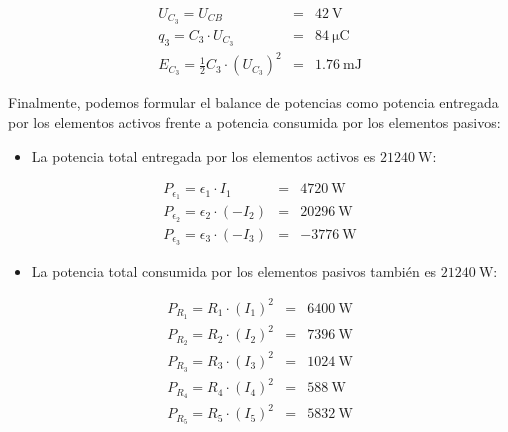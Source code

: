 \vspace{-4mm}
\begin{eqnarray*}
    U_{C_3} = U_{CB} & = & \qty{42}{\volt}\\
    q_3 = C_3 \cdot U_{C_3} & = & \boxed{\qty{84}{\micro\coulomb}}\\
    E_{C_3} = \frac{1}{2} C_3 \cdot (U_{C_3})^2 & = & \boxed{\qty{1.76}{\milli\joule}}
\end{eqnarray*}

\vspace{5mm}
Finalmente, podemos formular el balance de potencias como potencia entregada por los elementos activos frente a potencia consumida por los elementos pasivos:

\vspace{1mm}
\begin{itemize}
    \item La potencia total entregada por los elementos activos es $\qty{21240}{\watt}$:
\end{itemize}

\vspace{-7mm}
\begin{eqnarray*}
P_{\epsilon_1} = \epsilon_1 \cdot I_1 & = & \qty{4720}{\watt}\\
P_{\epsilon_2} = \epsilon_2 \cdot (-I_2) & = & \qty{20296}{\watt}\\
P_{\epsilon_3} = \epsilon_3 \cdot (-I_3) & = & \qty{-3776}{\watt}
\end{eqnarray*}

\vspace{1mm}
\begin{itemize}
    \item La potencia total consumida por los elementos pasivos también es $\qty{21240}{\watt}$:
\end{itemize}

\vspace{-6mm}
\begin{eqnarray*}
P_{R_1} = R_1 \cdot (I_1)^2 & = & \qty{6400}{\watt}\\
P_{R_2} = R_2 \cdot (I_2)^2 & = & \qty{7396}{\watt}\\
P_{R_3} = R_3 \cdot (I_3)^2 & = & \qty{1024}{\watt}\\
P_{R_4} = R_4 \cdot (I_4)^2 & = & \qty{588}{\watt}\\
P_{R_5} = R_5 \cdot (I_5)^2 & = & \qty{5832}{\watt}
\end{eqnarray*}

